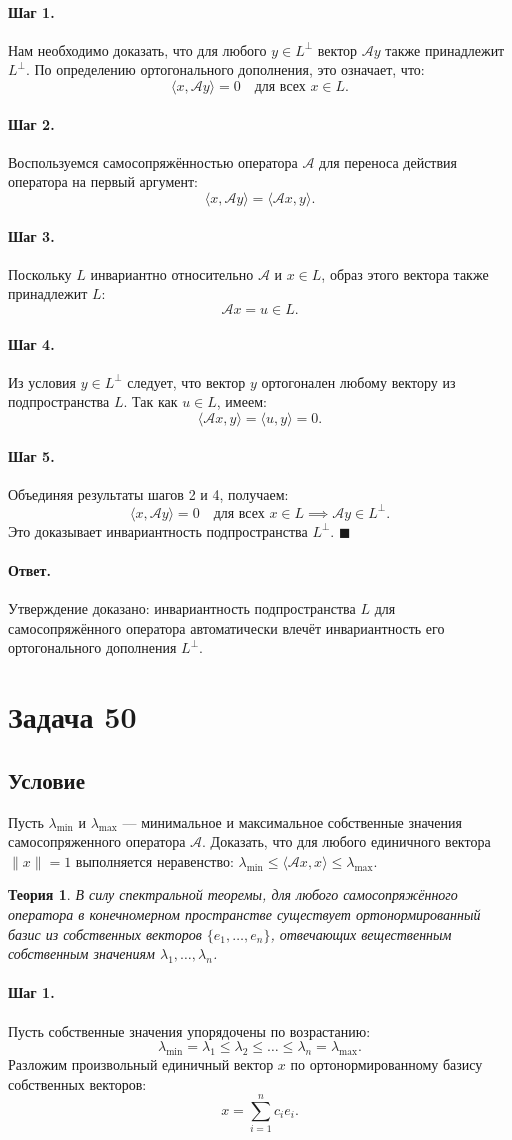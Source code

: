 \documentclass[12pt,a4paper]{article}
\theoremstyle{solution}
\newtheorem*{theory}{Теория}
\newcommand{\task}[1]{\newpage\section*{Задача #1}}
\newcommand{\answer}{\paragraph{Ответ.}}
\newcommand{\step}[1]{\paragraph{Шаг #1.}}
\begin{document}
\step{1} Нам необходимо доказать, что для любого $y \in L^\perp$ вектор $\mathcal{A}y$ также принадлежит $L^\perp$. По определению ортогонального дополнения, это означает, что:
\[
\langle x, \mathcal{A}y\rangle = 0 \quad \text{для всех } x \in L.
\]

\step{2} Воспользуемся самосопряжённостью оператора $\mathcal{A}$ для переноса действия оператора на первый аргумент:
\[
\langle x, \mathcal{A}y\rangle = \langle \mathcal{A}x, y\rangle.
\]

\step{3} Поскольку $L$ инвариантно относительно $\mathcal{A}$ и $x \in L$, образ этого вектора также принадлежит $L$:
\[
\mathcal{A}x = u \in L.
\]

\step{4} Из условия $y \in L^\perp$ следует, что вектор $y$ ортогонален любому вектору из подпространства $L$. Так как $u \in L$, имеем:
\[
\langle \mathcal{A}x, y\rangle = \langle u, y\rangle = 0.
\]

\step{5} Объединяя результаты шагов 2 и 4, получаем:
\[
\langle x, \mathcal{A}y\rangle = 0 \quad \text{для всех } x \in L \implies \mathcal{A}y \in L^\perp.
\]
Это доказывает инвариантность подпространства $L^\perp$. \quad$\blacksquare$

\answer
Утверждение доказано: инвариантность подпространства $L$ для самосопряжённого оператора автоматически влечёт инвариантность его ортогонального дополнения $L^\perp$.

\task{50}
\subsection*{Условие}
Пусть $\lambda_{\min}$ и $\lambda_{\max}$ — минимальное и максимальное собственные значения самосопряженного оператора $\mathcal{A}$. Доказать, что для любого единичного вектора $\|x\| = 1$ выполняется неравенство: $\lambda_{\min} \leq \langle \mathcal{A}x, x\rangle \leq \lambda_{\max}$.

\begin{theory}
В силу спектральной теоремы, для любого самосопряжённого оператора в конечномерном пространстве существует ортонормированный базис из собственных векторов $\{e_1, \ldots, e_n\}$, отвечающих вещественным собственным значениям $\lambda_1, \ldots, \lambda_n$.
\end{theory}

\step{1} Пусть собственные значения упорядочены по возрастанию:
\[
\lambda_{\min} = \lambda_1 \leq \lambda_2 \leq \dots \leq \lambda_n = \lambda_{\max}.
\]
Разложим произвольный единичный вектор $x$ по ортонормированному базису собственных векторов:
\[
x = \sum_{i=1}^n c_i e_i.
\]
\end{document}

